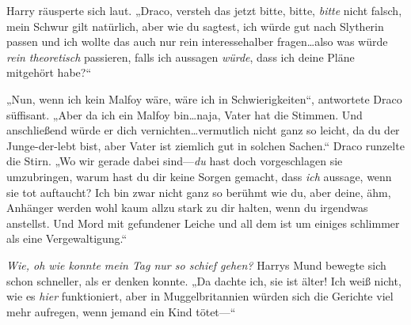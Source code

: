 Harry räusperte sich laut. „Draco, versteh das jetzt bitte, bitte, \emph{bitte} nicht falsch, mein Schwur gilt natürlich, aber wie du sagtest, ich würde gut nach Slytherin passen und ich wollte das auch nur rein interessehalber fragen…also was würde \emph{rein theoretisch} passieren, falls ich aussagen \emph{würde}, dass ich deine Pläne mitgehört habe?“

„Nun, wenn ich kein Malfoy wäre, wäre ich in Schwierigkeiten“, antwortete Draco süffisant. „Aber da ich ein Malfoy bin…naja, Vater hat die Stimmen. Und anschließend würde er dich vernichten…vermutlich nicht ganz so leicht, da du der Junge-der-lebt bist, aber Vater ist ziemlich gut in solchen Sachen.“ Draco runzelte die Stirn. „Wo wir gerade dabei sind—\emph{du} hast doch vorgeschlagen sie umzubringen, warum hast du dir keine Sorgen gemacht, dass \emph{ich} aussage, wenn sie tot auftaucht? Ich bin zwar nicht ganz so berühmt wie du, aber deine, ähm, Anhänger werden wohl kaum allzu stark zu dir halten, wenn du irgendwas anstellst. Und Mord mit gefundener Leiche und all dem ist um einiges schlimmer als eine Vergewaltigung.“

\emph{Wie, oh wie konnte mein Tag nur so schief gehen?} Harrys Mund bewegte sich schon schneller, als er denken konnte. „Da dachte ich, sie ist älter! Ich weiß nicht, wie es \emph{hier} funktioniert, aber in Muggelbritannien würden sich die Gerichte viel mehr aufregen, wenn jemand ein Kind tötet—“

